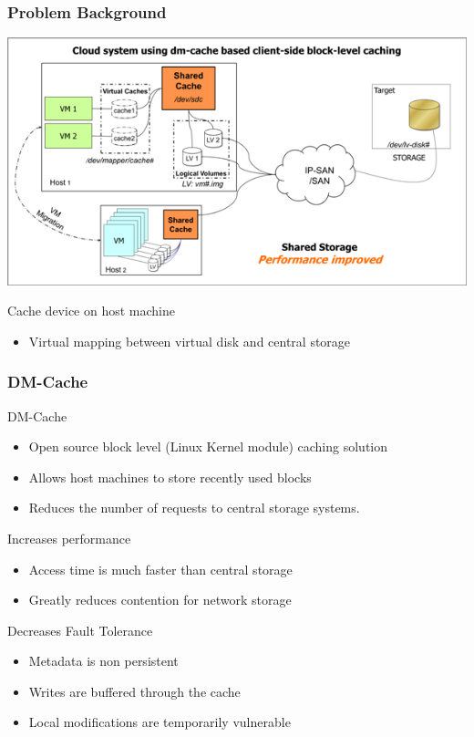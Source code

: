 \documentclass{beamer}
\begin{document}
\begin{frame}
  \frametitle{Problem Background}
  \begin{center}
    \includegraphics[scale=0.75]{../Images/NewerImage.png}
  \end{center}

  Cache device on host machine
  \begin{itemize}
    \item Virtual mapping between virtual disk and central storage
  \end{itemize}

\end{frame}

\begin{frame}
  \frametitle{DM-Cache}

  DM-Cache
  \begin{itemize}
    \item Open source block level (Linux Kernel module) caching
    solution
    \item Allows host machines to store recently used blocks
    \item Reduces the number of requests to central storage systems.
  \end{itemize}

  Increases performance
  \begin{itemize}
    \item Access time is much faster than central storage
    \item Greatly reduces contention for network storage
  \end{itemize}

  Decreases Fault Tolerance
  \begin{itemize}
    \item Metadata is non persistent
    \item Writes are buffered through the cache
    \item Local modifications are temporarily vulnerable
  \end{itemize}

\end{frame}
\end{document}
